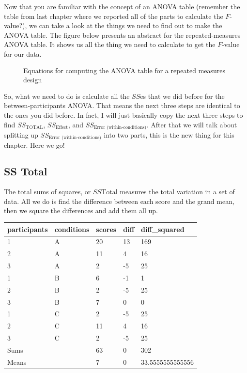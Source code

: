 \documentclass[
]{book}
\makeatletter
\newcommand*\pandocbounded[1]{%
  \sbox\pandoc@box{#1}%
  \Gscale@div\@tempa{\textheight}{\dimexpr\ht\pandoc@box+\dp\pandoc@box\relax}%
  \Gscale@div\@tempb{\linewidth}{\wd\pandoc@box}%
  \ifdim\@tempb\p@<\@tempa\p@\let\@tempa\@tempb\fi%
  \ifdim\@tempa\p@<\p@\scalebox{\@tempa}{\usebox\pandoc@box}%
  \else\usebox{\pandoc@box}%
  \fi%
}
\makeatother
\begin{document}
Now that you are familiar with the concept of an ANOVA table (remember the table from last chapter where we reported all of the parts to calculate the \(F\)-value?), we can take a look at the things we need to find out to make the ANOVA table. The figure below presents an abstract for the repeated-measures ANOVA table. It shows us all the thing we need to calculate to get the \(F\)-value for our data.

\begin{figure}
\centering
\pandocbounded{\texttt{[image: figures/RMANOVA\_table.png]}}
\caption{\label{fig:8rmtable}Equations for computing the ANOVA table for a repeated measures design}
\end{figure}

So, what we need to do is calculate all the \(SS\)es that we did before for the between-participants ANOVA. That means the next three steps are identical to the ones you did before. In fact, I will just basically copy the next three steps to find \(SS_\text{TOTAL}\), \(SS_\text{Effect}\), and \(SS_\text{Error (within-conditions)}\). After that we will talk about splitting up \(SS_\text{Error (within-conditions)}\) into two parts, this is the new thing for this chapter. Here we go!

\subsection{SS Total}\label{ss-total-1}

The total sums of squares, or \(SS\text{Total}\) measures the total variation in a set of data. All we do is find the difference between each score and the grand mean, then we square the differences and add them all up.

\begin{tabular}[t]{l|l|l|l|l}
\hline
participants & conditions & scores & diff & diff\_squared\\
\hline
1 & A & 20 & 13 & 169\\
\hline
2 & A & 11 & 4 & 16\\
\hline
3 & A & 2 & -5 & 25\\
\hline
1 & B & 6 & -1 & 1\\
\hline
2 & B & 2 & -5 & 25\\
\hline
3 & B & 7 & 0 & 0\\
\hline
1 & C & 2 & -5 & 25\\
\hline
2 & C & 11 & 4 & 16\\
\hline
3 & C & 2 & -5 & 25\\
\hline
Sums &  & 63 & 0 & 302\\
\hline
Means &  & 7 & 0 & 33.5555555555556\\
\hline
\end{tabular}
\end{document}
